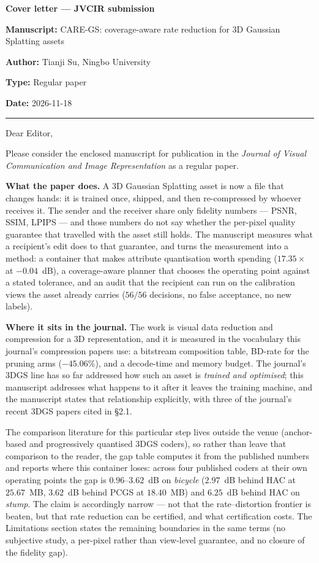 \documentclass[11pt]{article}
\begin{document}
\begin{center}{\Large\bfseries Cover letter --- JVCIR submission}\end{center}

\textbf{Manuscript:} CARE-GS: coverage-aware rate reduction for 3D Gaussian Splatting assets\par
\textbf{Author:} Tianji Su, Ningbo University\par
\textbf{Type:} Regular paper\par
\textbf{Date:} 2026-11-18\par

\medskip\hrule\medskip

Dear Editor,

Please consider the enclosed manuscript for publication in the \emph{Journal of Visual Communication and Image
Representation} as a regular paper.

\textbf{What the paper does.} A 3D Gaussian Splatting asset is now a file that changes hands: it is trained once,
shipped, and then re-compressed by whoever receives it. The sender and the receiver share only fidelity numbers ---
PSNR, SSIM, LPIPS --- and those numbers do not say whether the per-pixel quality guarantee that travelled with the
asset still holds. The manuscript measures what a recipient's edit does to that guarantee, and turns the measurement
into a method: a container that makes attribute quantisation worth spending ($17.35\times$ at $-0.04$~dB), a
coverage-aware planner that chooses the operating point against a stated tolerance, and an audit that the recipient
can run on the calibration views the asset already carries ($56/56$ decisions, no false acceptance, no new labels).

\textbf{Where it sits in the journal.} The work is visual data reduction and compression for a 3D representation, and
it is measured in the vocabulary this journal's compression papers use: a bitstream composition table, BD-rate for the
pruning arms ($-45.06\%$), and a decode-time and memory budget. The journal's 3DGS line has so far addressed how such
an asset is \emph{trained and optimised}; this manuscript addresses what happens to it after it leaves the training
machine, and the manuscript states that relationship explicitly, with three of the journal's recent 3DGS papers cited
in \S2.1.

The comparison literature for this particular step lives outside the venue (anchor-based and progressively quantised
3DGS coders), so rather than leave that comparison to the reader, the gap table computes it from the published numbers
and reports where this container loses: across four published coders at their own operating points the gap is
$0.96$--$3.62$~dB on \emph{bicycle} ($2.97$~dB behind HAC at $25.67$~MB, $3.62$~dB behind PCGS at $18.40$~MB) and
$6.25$~dB behind HAC on \emph{stump}. The claim is accordingly narrow --- not that the rate--distortion frontier is
beaten, but that rate reduction can be certified, and what certification costs. The Limitations section states the
remaining boundaries in the same terms (no subjective study, a per-pixel rather than view-level guarantee, and no
closure of the fidelity gap).
\end{document}
